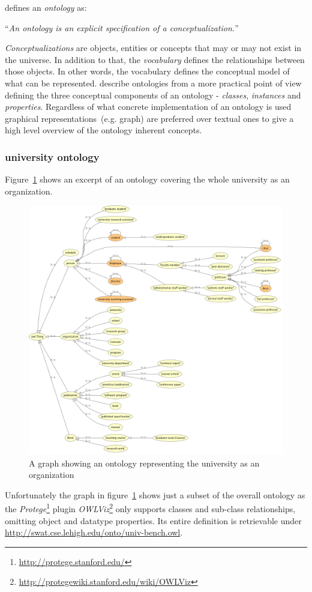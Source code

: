 \documentclass{article}
\begin{document}
\citet{jour:gruber} defines an \textit{ontology} as:

``\textit{An ontology is an explicit specification of a conceptualization.}''

\textit{Conceptualizations} are objects, entities or concepts that may or may not exist in the universe. In addition to that, the \textit{vocabulary} defines the relationships between those objects. In other words, the vocabulary defines the conceptual model of what can be represented. 
\citet{jour:owl} describe ontologies from a more practical point of view defining the three conceptual components of an ontology - \textit{classes}, \textit{instances} and \textit{properties}. Regardless of what concrete implementation of an ontology is used graphical representations~(e.g. graph) are preferred over textual ones to give a high level overview of the ontology inherent concepts. 

\subsubsection{university ontology}
Figure~\ref{fig:owl-univ1} shows an excerpt of an ontology covering the whole university as an organization.
\begin{figure}[H]
	\centering \includegraphics*[width=.8\columnwidth]{owl-univ1.png}
	\caption{A graph showing an ontology representing the university as an organization}
	\label{fig:owl-univ1}
\end{figure}
Unfortunately the graph in figure~\ref{fig:owl-univ1} shows just a subset of the overall ontology as the \textit{Protege}\footnote{\url{http://protege.stanford.edu/}} plugin \textit{OWLViz}\footnote{\url{http://protegewiki.stanford.edu/wiki/OWLViz}} only supports classes and sub-class relationships, omitting object and datatype properties. Its entire definition is retrievable under \url{http://swat.cse.lehigh.edu/onto/univ-bench.owl}. 
\end{document}
